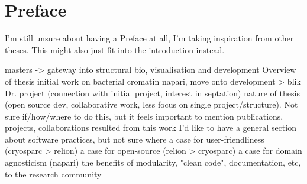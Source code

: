 \chapter{Preface}


I'm still unsure about having a Preface at all, I'm taking inspiration from other theses. This might also just fit into the introduction instead.

\begin{outline}
\1 masters -> gateway into structural bio, visualisation and development
\1 Overview of thesis
    \2 initial work on bacterial cromatin
    \2 napari, move onto development > blik
    \2 Dr. project (connection with initial project, interest in septation)
\1 nature of thesis (open source dev, collaborative work, less focus on single project/structure). Not sure if/how/where to do this, but it feels important to mention
\1 publications, projects, collaborations resulted from this work
\1 I'd like to have a general section about software practices, but not sure where
    \2 a case for user-friendliness (cryosparc > relion)
    \2 a case for open-source (relion > cryosparc)
    \2 a case for domain agnosticism (napari)
    \2 the benefits of modularity, "clean code", documentation, etc, to the research community
\end{outline}

